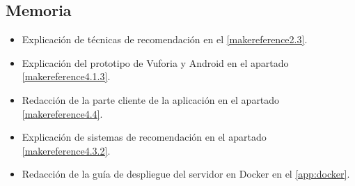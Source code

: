     \subsection{Memoria}
    \label{makereference7.4.3}
        \begin{itemize}
            \item Explicación de técnicas de recomendación en el \autoref{makereference2.3}.
            \item Explicación del prototipo de Vuforia y Android en el apartado \autoref{makereference4.1.3}.
            \item Redacción de la parte cliente de la aplicación en el apartado \autoref{makereference4.4}.
            \item Explicación de sistemas de recomendación en el apartado \autoref{makereference4.3.2}.
            \item Redacción de la guía de despliegue del servidor en Docker en el \autoref{app:docker}.
        \end{itemize}
